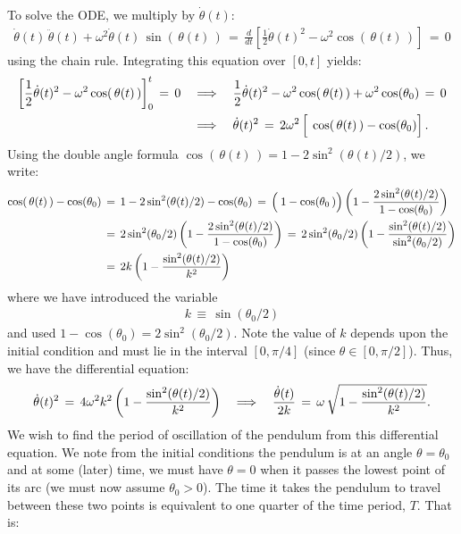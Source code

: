 \documentclass{tjwNOTES}
\begin{document}
To solve the ODE, we multiply by $\dot{\theta}(t)$:
\begin{align*}
	\dot{\theta}(t)\,\ddot{\theta}(t) + \omega^{2}\dot{\theta}(t)\,\sin(\,\theta(t)\,) \,=\, \frac{d}{dt}\left[ \frac{1}{2}\dot{\theta}(t)^{2} - \omega^{2}\cos(\,\theta(t)\,) \right] \,=\, 0
\end{align*}
using the chain rule. Integrating this equation over $[0,t]$ yields:
\begin{align*}
	\left[\frac{1}{2}\dot{\theta}(t)^{2} - \omega^{2}\cos(\,\theta(t)\,) \right]_{0}^{t} \,=\, 0 &\quad\Longrightarrow\quad \frac{1}{2}\dot{\theta}(t)^{2} - \omega^{2}\cos(\,\theta(t)\,) + \omega^{2}\cos(\theta_{0})  \,=\, 0 \\[0cm]
	&\quad\Longrightarrow\quad \dot{\theta}(t)^{2} \,=\, 2\omega^{2}\left[\frac{}{}\cos(\,\theta(t)\,)-\cos(\theta_{0})\right].
\end{align*}
Using the double angle formula $\cos(\,\theta(t)\,)=1-2\sin^{2}(\theta(t)/2)$, we write:
\begin{align*}
	\cos(\,\theta(t)\,)-\cos(\theta_{0}) &\,=\, 1-2\sin^{2}(\theta(t)/2)-\cos(\theta_{0}) \,=\, \left(\frac{}{}1-\cos(\theta_{0}\,)\right)\left( 1- \frac{2\sin^{2}(\theta(t)/2)}{1-\cos(\theta_{0})}\right)  \\[0cm]
		&\,=\, 2\sin^{2}(\theta_{0}/2)\left( 1- \frac{2\sin^{2}(\theta(t)/2)}{1-\cos(\theta_{0})}\right) \,=\, 2\sin^{2}(\theta_{0}/2)\left( 1- \frac{\sin^{2}(\theta(t)/2)}{\sin^{2}(\theta_{0}/2)}\right)  \\
		&\,=\, 2k\left( 1- \frac{\sin^{2}(\theta(t)/2)}{k^{2}}\right)
\end{align*}
where we have introduced the variable
\begin{align*}
	k \,\equiv\, \sin(\theta_{0}/2)
\end{align*}
and used $1-\cos(\theta_{0})=2\sin^{2}(\theta_{0}/2)$. Note the value of $k$ depends upon the initial condition and must lie in the interval $[0,\pi/4]$ (since $\theta\in[0,\pi/2]$). Thus, we have the differential equation:
\begin{align*}
	\dot{\theta}(t)^{2} \,=\, 4\omega^{2}k^{2}\left( 1- \frac{\sin^{2}(\theta(t)/2)}{k^{2}}\right) \quad\Longrightarrow\quad \frac{\dot{\theta}(t)}{2k} \,=\, \omega\,\sqrt{ 1- \frac{\sin^{2}(\theta(t)/2)}{k^{2}} }.
\end{align*}
We wish to find the period of oscillation of the pendulum from this differential equation. We note from the initial conditions the pendulum is at an angle $\theta=\theta_{0}$ and at some (later) time, we must have $\theta=0$ when it passes the lowest point of its arc (we must now assume $\theta_{0}>0$). The time it takes the pendulum to travel between these two points is equivalent to one quarter of the time period, $T$. That is:
\end{document}
